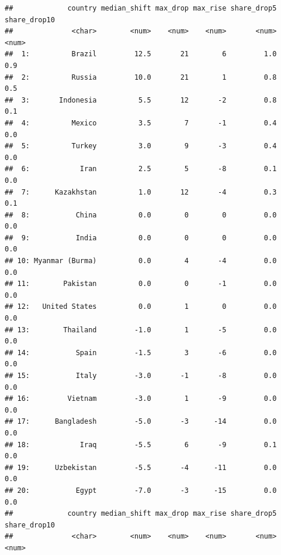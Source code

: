 \documentclass[
  11pt,
]{article}
\begin{document}
\begin{verbatim}
##             country median_shift max_drop max_rise share_drop5 share_drop10
##              <char>        <num>    <num>    <num>       <num>        <num>
##  1:          Brazil         12.5       21        6         1.0          0.9
##  2:          Russia         10.0       21        1         0.8          0.5
##  3:       Indonesia          5.5       12       -2         0.8          0.1
##  4:          Mexico          3.5        7       -1         0.4          0.0
##  5:          Turkey          3.0        9       -3         0.4          0.0
##  6:            Iran          2.5        5       -8         0.1          0.0
##  7:      Kazakhstan          1.0       12       -4         0.3          0.1
##  8:           China          0.0        0        0         0.0          0.0
##  9:           India          0.0        0        0         0.0          0.0
## 10: Myanmar (Burma)          0.0        4       -4         0.0          0.0
## 11:        Pakistan          0.0        0       -1         0.0          0.0
## 12:   United States          0.0        1        0         0.0          0.0
## 13:        Thailand         -1.0        1       -5         0.0          0.0
## 14:           Spain         -1.5        3       -6         0.0          0.0
## 15:           Italy         -3.0       -1       -8         0.0          0.0
## 16:         Vietnam         -3.0        1       -9         0.0          0.0
## 17:      Bangladesh         -5.0       -3      -14         0.0          0.0
## 18:            Iraq         -5.5        6       -9         0.1          0.0
## 19:      Uzbekistan         -5.5       -4      -11         0.0          0.0
## 20:           Egypt         -7.0       -3      -15         0.0          0.0
##             country median_shift max_drop max_rise share_drop5 share_drop10
##              <char>        <num>    <num>    <num>       <num>        <num>
\end{verbatim}
\end{document}

